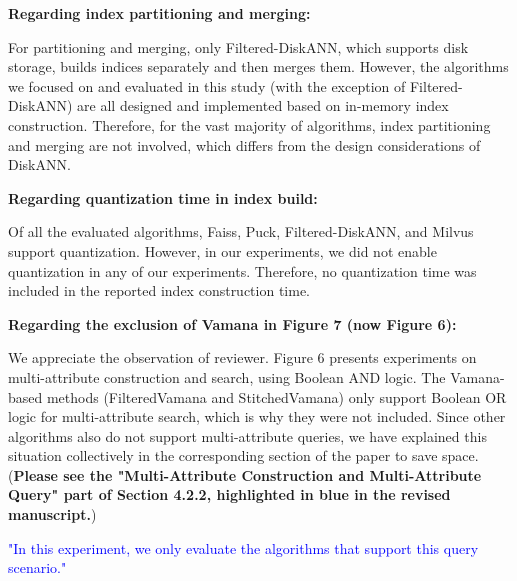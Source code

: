 \documentclass[sigconf, nonacm]{acmart}
\newcounter{observation}[section]
\begin{document}
\textbf{Regarding index partitioning and merging:}

For partitioning and merging, only Filtered-DiskANN, which supports disk storage, builds indices separately and then merges them. However, the algorithms we focused on and evaluated in this study (with the exception of Filtered-DiskANN) are all designed and implemented based on in-memory index construction. Therefore, for the vast majority of algorithms, index partitioning and merging are not involved, which differs from the design considerations of DiskANN.

\textbf{Regarding quantization time in index build:}

Of all the evaluated algorithms, Faiss, Puck, Filtered-DiskANN, and Milvus support quantization. However, in our experiments, we did not enable quantization in any of our experiments. Therefore, no quantization time was included in the reported index construction time.

\textbf{Regarding the exclusion of Vamana in Figure 7 (now Figure 6):}

We appreciate the observation of reviewer. Figure 6 presents experiments on multi-attribute construction and search, using Boolean AND logic. The Vamana-based methods (FilteredVamana and StitchedVamana) only support Boolean OR logic for multi-attribute search, which is why they were not included. Since other algorithms also do not support multi-attribute queries, we have explained this situation collectively in the corresponding section of the paper to save space. (\textbf{Please see the "Multi-Attribute Construction and Multi-Attribute Query" part of Section 4.2.2, highlighted in blue in the revised manuscript.})

\textcolor{blue}{"In this experiment, we only evaluate the algorithms that support this query scenario."}


\end{document}
